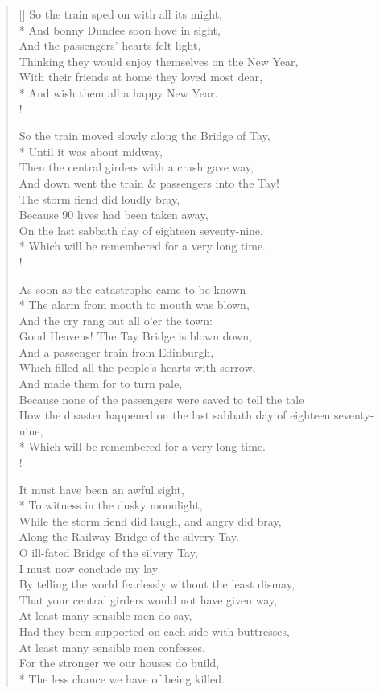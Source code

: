 \documentclass[MAIN]{subfiles}
\begin{document}
\begin{verse}[\versewidth]
So the train sped on with all its might,\\*
And bonny {\sc Dundee} soon hove in sight,\\
And the passengers' hearts felt light,\\
Thinking they would enjoy themselves on the New Year,\\
With their friends at home they loved most dear,\\*
And wish them all a happy New Year.\\!

So the train moved slowly along the {\sc Bridge of Tay},\\*
Until it was about midway,\\
Then the central girders with a crash gave way,\\
And down went the train \& passengers into the {\sc Tay}!\\
The storm fiend did loudly bray,\\
Because 90 lives had been taken away,\\
On the last sabbath day of eighteen seventy-nine,\\*
Which will be remembered for a very long time.\\!

As soon as the catastrophe came to be known\\*
The alarm from mouth to mouth was blown,\\
And the cry rang out all o'er the town:\\
Good Heavens! The {\sc Tay Bridge} is blown down,\\
And a passenger train from Edinburgh,\\
Which filled all the people's hearts with sorrow,\\
And made them for to turn pale,\\
Because none of the passengers were saved to tell the tale\\
How the disaster happened on the last sabbath day of eighteen seventy-nine,\\*
Which will be remembered for a very long time.\\!

It must have been an awful sight,\\*
To witness in the dusky moonlight,\\
While the storm fiend did laugh, and angry did bray,\\
Along the {\sc Railway Bridge} of the silvery {\sc Tay}.\\
O ill-fated {\sc Bridge} of the silvery {\sc Tay},\\
I must now conclude my lay\\
By telling the world fearlessly without the least dismay,\\
That your central girders would not have given way,\\
At least many sensible men do say,\\
Had they been supported on each side with buttresses,\\
At least many sensible men confesses,\\
For the stronger we our houses do build,\\*
The less chance we have of being killed.
\end{verse}
\end{document}
